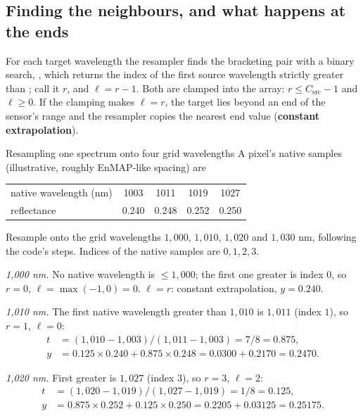 \subsection{Finding the neighbours, and what happens at the ends}

For each target wavelength the resampler finds the bracketing pair with a binary search,
, which returns the index of the first
source wavelength strictly greater than ; call it $r$, and $\ell = r - 1$. Both are clamped
into the array: $r \le C_{\mathrm{src}} - 1$ and $\ell \ge 0$. If the clamping makes $\ell = r$,
the target lies beyond an end of the sensor's range and the resampler copies the nearest end value
(\textbf{constant extrapolation}).

\begin{worked}[label={we:bandpipeline:resample}]{Resampling one spectrum onto four grid wavelengths}
A pixel's native samples (illustrative\tagA, roughly EnMAP-like spacing) are
\begin{center}
\begin{tabular}{@{}lcccc@{}}\toprule
native wavelength (nm) & 1003 & 1011 & 1019 & 1027\\
reflectance & 0.240 & 0.248 & 0.252 & 0.250\\\bottomrule
\end{tabular}
\end{center}
Resample onto the grid wavelengths $1{,}000$, $1{,}010$, $1{,}020$ and $1{,}030$ nm, following the
code's steps. Indices of the native samples are $0, 1, 2, 3$.

\emph{1,000 nm.} No native wavelength is $\le 1{,}000$; the first one greater is index $0$, so
$r = 0$, $\ell = \max(-1, 0) = 0$. $\ell = r$: constant extrapolation, $y = 0.240$.

\emph{1,010 nm.} The first native wavelength greater than $1{,}010$ is $1{,}011$ (index $1$), so
$r = 1$, $\ell = 0$:
\begin{align*}
t &= (1{,}010 - 1{,}003)/(1{,}011 - 1{,}003) = 7/8 = 0.875,\\
y &= 0.125 \times 0.240 + 0.875 \times 0.248 = 0.0300 + 0.2170 = 0.2470.
\end{align*}

\emph{1,020 nm.} First greater is $1{,}027$ (index $3$), so $r = 3$, $\ell = 2$:
\begin{align*}
t &= (1{,}020 - 1{,}019)/(1{,}027 - 1{,}019) = 1/8 = 0.125,\\
y &= 0.875 \times 0.252 + 0.125 \times 0.250 = 0.2205 + 0.03125 = 0.25175.
\end{align*}


\end{worked}
